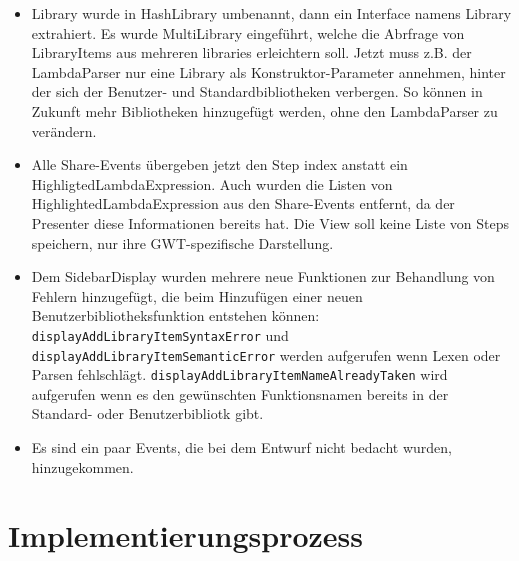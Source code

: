 \documentclass[parskip=full,11pt,twoside]{scrartcl}
\begin{document}
\begin{itemize}
    \item Library wurde in HashLibrary umbenannt, dann ein Interface namens Library extrahiert. Es wurde MultiLibrary eingeführt, welche die Abrfrage von LibraryItems aus mehreren libraries erleichtern soll. Jetzt muss z.B. der LambdaParser nur eine Library als Konstruktor-Parameter annehmen, hinter der sich der Benutzer- und Standardbibliotheken verbergen. So können in Zukunft mehr Bibliotheken hinzugefügt werden, ohne den LambdaParser zu verändern.
    \newline

    \item Alle Share-Events übergeben jetzt den Step index anstatt ein HighligtedLambdaExpression. Auch wurden die Listen von HighlightedLambdaExpression aus den Share-Events entfernt, da der Presenter diese Informationen bereits hat. Die View soll keine Liste von Steps speichern, nur ihre GWT-spezifische Darstellung.

    \item Dem SidebarDisplay wurden mehrere neue Funktionen zur Behandlung von Fehlern hinzugefügt, die beim Hinzufügen einer neuen Benutzerbibliotheksfunktion entstehen können:
    	\texttt{displayAddLibraryItemSyntaxError} und \newline
        \texttt{displayAddLibraryItemSemanticError} werden aufgerufen wenn Lexen oder Parsen fehlschlägt.
        \texttt{displayAddLibraryItemNameAlreadyTaken} wird aufgerufen wenn es den gewünschten Funktionsnamen bereits in der Standard- oder Benutzerbibliotk gibt.

    \item Es sind ein paar Events, die bei dem Entwurf nicht bedacht wurden, 	hinzugekommen.
\end{itemize}



\section{Implementierungsprozess}
\end{document}
